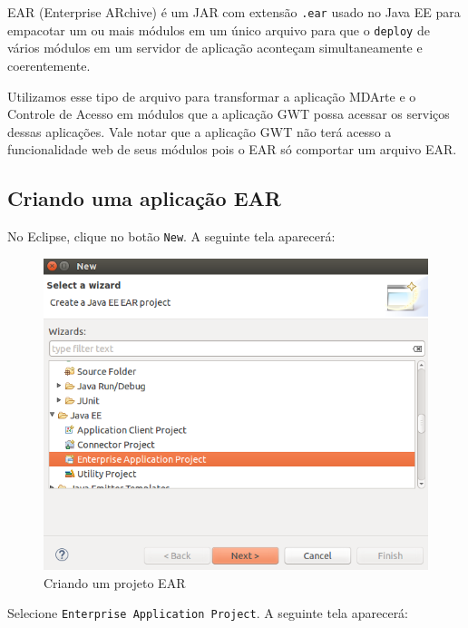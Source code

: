 EAR (Enterprise ARchive) é um JAR com extensão \texttt{.ear} usado no Java EE para empacotar um ou mais módulos em um único
arquivo para que o \texttt{deploy} de vários módulos em um servidor de aplicação aconteçam simultaneamente e coerentemente.

Utilizamos esse tipo de arquivo para transformar a aplicação MDArte e o Controle de Acesso em módulos que a aplicação GWT possa
acessar os serviços dessas aplicações. Vale notar que a aplicação GWT não terá acesso a funcionalidade web de seus módulos pois o
EAR só comportar um arquivo EAR.

\subsection{Criando uma aplicação EAR}

No Eclipse, clique no botão \texttt{New}. A seguinte tela aparecerá:

\begin{figure}[H]
	\centering
	\includegraphics[scale=0.5]{files/imgs/gwt-04.png}
	\caption{Criando um projeto EAR}
	\label{gwt04}
\end{figure}

Selecione \texttt{Enterprise Application Project}. A seguinte tela aparecerá:

